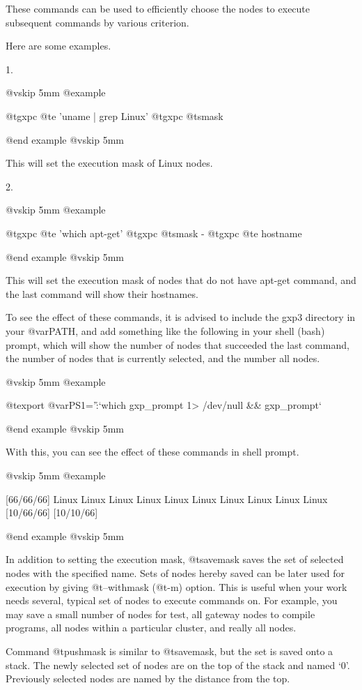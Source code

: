 These commands can be used to efficiently choose the nodes
to execute subsequent commands by various criterion.

Here are some examples.

1.

@vskip 5mm
@example

  @t{gxpc}  @t{e}  'uname | grep Linux'
  @t{gxpc}  @t{smask}

@end example
@vskip 5mm

This will set the execution mask of Linux nodes.

2.

@vskip 5mm
@example

  @t{gxpc}  @t{e}  'which apt-get'
  @t{gxpc}  @t{smask}  -
  @t{gxpc}  @t{e}  hostname

@end example
@vskip 5mm

This will set the execution mask of nodes that do not have apt-get
command, and the last command will show their hostnames.

To see the effect of these commands, it is advised to include the
gxp3 directory in your @var{PATH}, and add something like the following
in your shell (bash) prompt, which will show the number of nodes
that succeeded the last command, the number of nodes that is
currently selected, and the number all nodes.

@vskip 5mm
@example

  @t{export} @var{PS1}='\h:\W`which gxp_prompt 1> /dev/null && gxp_prompt`%

@end example
@vskip 5mm

With this, you can see the effect of these commands in shell
prompt.

@vskip 5mm
@example

  [66/66/66]%
  Linux
  Linux
  Linux
  Linux
  Linux
  Linux
  Linux
  Linux
  Linux
  Linux
  [10/66/66]%
  [10/10/66]%

@end example
@vskip 5mm

In addition to setting the execution mask, @t{savemask} saves the set
of selected nodes with the specified name. Sets of nodes hereby
saved can be later used for execution by giving @t{--withmask} (@t{-m})
option. This is useful when your work needs several, typical set
of nodes to execute commands on. For example, you may save a
small number of nodes for test, all gateway nodes to compile
programs, all nodes within a particular cluster, and really all
nodes.

Command @t{pushmask} is similar to @t{savemask}, but the set is saved
onto a stack. The newly selected set of nodes are on the top of
the stack and named `0'.  Previously selected nodes are named by
the distance from the top.

